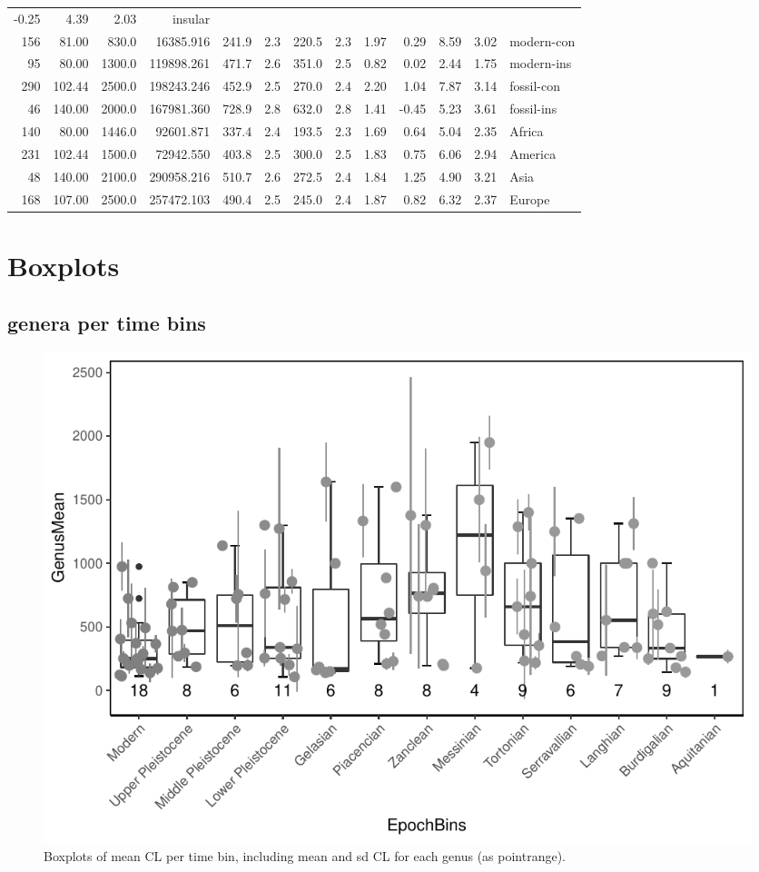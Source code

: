 \documentclass[]{article}
\begin{document}
\begin{longtable}[]{@{}rrrrrrrrrrrrl@{}}
-0.25 & 4.39 & 2.03 & insular\tabularnewline
156 & 81.00 & 830.0 & 16385.916 & 241.9 & 2.3 & 220.5 & 2.3 & 1.97 &
0.29 & 8.59 & 3.02 & modern-con\tabularnewline
95 & 80.00 & 1300.0 & 119898.261 & 471.7 & 2.6 & 351.0 & 2.5 & 0.82 &
0.02 & 2.44 & 1.75 & modern-ins\tabularnewline
290 & 102.44 & 2500.0 & 198243.246 & 452.9 & 2.5 & 270.0 & 2.4 & 2.20 &
1.04 & 7.87 & 3.14 & fossil-con\tabularnewline
46 & 140.00 & 2000.0 & 167981.360 & 728.9 & 2.8 & 632.0 & 2.8 & 1.41 &
-0.45 & 5.23 & 3.61 & fossil-ins\tabularnewline
140 & 80.00 & 1446.0 & 92601.871 & 337.4 & 2.4 & 193.5 & 2.3 & 1.69 &
0.64 & 5.04 & 2.35 & Africa\tabularnewline
231 & 102.44 & 1500.0 & 72942.550 & 403.8 & 2.5 & 300.0 & 2.5 & 1.83 &
0.75 & 6.06 & 2.94 & America\tabularnewline
48 & 140.00 & 2100.0 & 290958.216 & 510.7 & 2.6 & 272.5 & 2.4 & 1.84 &
1.25 & 4.90 & 3.21 & Asia\tabularnewline
168 & 107.00 & 2500.0 & 257472.103 & 490.4 & 2.5 & 245.0 & 2.4 & 1.87 &
0.82 & 6.32 & 2.37 & Europe\tabularnewline
\bottomrule
\end{longtable}

\newpage

\section{Boxplots}\label{boxplots}

\subsection{genera per time bins}\label{genera-per-time-bins}

\begin{figure}[htbp]
\centering
\includegraphics{MA_JJ_files/figure-latex/Boxplots of each genus per time bin-1.pdf}
\caption{Boxplots of mean CL per time bin, including mean and sd CL for
each genus (as pointrange).}
\end{figure}
\end{document}
